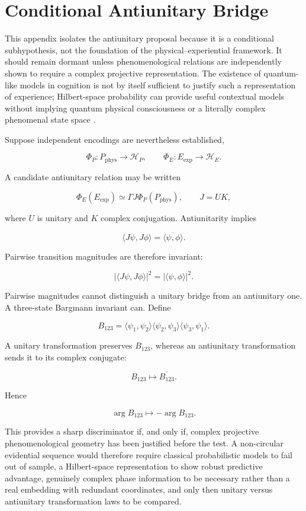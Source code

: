 \chapter{Conditional Antiunitary Bridge}

This appendix isolates the antiunitary proposal because it is a conditional subhypothesis, not the foundation of the physical--experiential framework. It should remain dormant unless phenomenological relations are independently shown to require a complex projective representation. The existence of quantum-like models in cognition is not by itself sufficient to justify such a representation of experience; Hilbert-space probability can provide useful contextual models without implying quantum physical consciousness or a literally complex phenomenal state space \cite{pothos2022QuantumCognition}.

Suppose independent encodings are nevertheless established,

\[
\Phi_P:P_{\mathrm{phys}}\to\mathcal H_P,
\qquad
\Phi_E:E_{\mathrm{exp}}\to\mathcal H_E.
\]

A candidate antiunitary relation may be written

\[
\Phi_E(E_{\mathrm{exp}})\simeq\Gamma J\Phi_P(P_{\mathrm{phys}}),
\qquad
J=UK,
\]

where $U$ is unitary and $K$ complex conjugation. Antiunitarity implies

\[
\langle J\psi,J\phi\rangle=\overline{\langle\psi,\phi\rangle}.
\]

Pairwise transition magnitudes are therefore invariant:

\[
|\langle J\psi,J\phi\rangle|^2=|\langle\psi,\phi\rangle|^2.
\]

Pairwise magnitudes cannot distinguish a unitary bridge from an antiunitary one. A three-state Bargmann invariant can. Define

\[
B_{123}=\langle\psi_1,\psi_2\rangle\langle\psi_2,\psi_3\rangle\langle\psi_3,\psi_1\rangle.
\]

A unitary transformation preserves $B_{123}$, whereas an antiunitary transformation sends it to its complex conjugate:

\[
B_{123}\mapsto\overline{B_{123}}.
\]

Hence

\[
\arg B_{123}\mapsto-\arg B_{123}.
\]

This provides a sharp discriminator if, and only if, complex projective phenomenological geometry has been justified before the test. A non-circular evidential sequence would therefore require classical probabilistic models to fail out of sample, a Hilbert-space representation to show robust predictive advantage, genuinely complex phase information to be necessary rather than a real embedding with redundant coordinates, and only then unitary versus antiunitary transformation laws to be compared.

